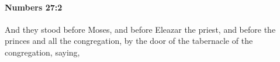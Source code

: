 
		\paragraph{Numbers 27:2} %
			\label{NUMBERS-27-2}

			And they stood before Moses, and before Eleazar the priest, and before the princes and all the congregation, by the door of the tabernacle of the congregation, saying,


